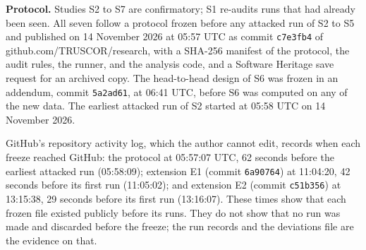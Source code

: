 \documentclass[
  american,
  10pt,
  a4paper,
]{article}
\begin{document}
\textbf{Protocol.} Studies S2 to S7 are confirmatory; S1 re-audits runs
that had already been seen. All seven follow a protocol frozen before
any attacked run of S2 to S5 and published on 14 November 2026 at 05:57
UTC as commit \texttt{c7e3fb4} of github.com/TRUSCOR/research, with a
SHA-256 manifest of the protocol, the audit rules, the runner, and the
analysis code, and a Software Heritage save request for an archived
copy. The head-to-head design of S6 was frozen in an addendum, commit
\texttt{5a2ad61}, at 06:41 UTC, before S6 was computed on any of the new
data. The earliest attacked run of S2 started at 05:58 UTC on 14
November 2026.

GitHub's repository activity log, which the author cannot edit, records
when each freeze reached GitHub: the protocol at 05:57:07 UTC, 62
seconds before the earliest attacked run (05:58:09); extension E1
(commit \texttt{6a90764}) at 11:04:20, 42 seconds before its first run
(11:05:02); and extension E2 (commit \texttt{c51b356}) at 13:15:38, 29
seconds before its first run (13:16:07). These times show that each
frozen file existed publicly before its runs. They do not show that no
run was made and discarded before the freeze; the run records and the
deviations file are the evidence on that.
\end{document}
